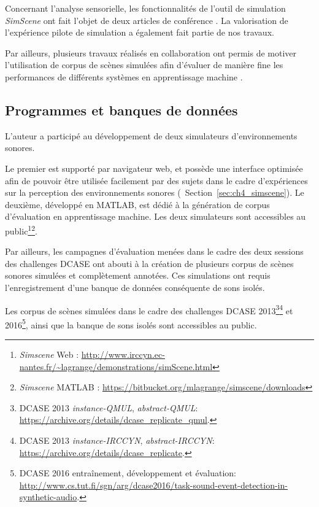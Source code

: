 Concernant l'analyse sensorielle, les fonctionnalités de l'outil de simulation \emph{SimScene} ont fait l'objet de deux articles de conférence  \citep{rossignol2015simscene,lafay2016JAES}. La valorisation de l'expérience pilote de simulation \citep{lafay2014new} a également fait partie de nos travaux.

Par ailleurs, plusieurs travaux réalisés en collaboration ont permis de motiver l'utilisation de corpus de scènes simulées afin d'évaluer de manière fine les performances de différents systèmes en apprentissage machine \citep{benetos2016detectionLDC,rossignol2015alternate,benetos2016detection}.

\subsection{Programmes et banques de données}

L'auteur a participé au développement de deux simulateurs d'environnements sonores.

Le premier est supporté par navigateur web, et possède une interface optimisée afin de pouvoir être utilisée facilement par des sujets dans le cadre d'expériences sur la perception des environnements sonores (\cf~Section~\ref{sec:ch4_simscene}). Le deuxième, développé en MATLAB, est dédié à la génération de corpus d'évaluation en apprentissage machine. Les deux simulateurs sont accessibles au public\footnote{\emph{Simscene} Web :  \url{http://www.irccyn.ec-nantes.fr/~lagrange/demonstrations/simScene.html}}\footnote{\emph{Simscene} MATLAB : \url{https://bitbucket.org/mlagrange/simscene/downloads}}.

Par ailleurs, les campagnes d'évaluation menées dans le cadre des deux sessions des challenges DCASE ont abouti à la création de plusieurs corpus de scènes sonores simulées et complètement annotées. Ces simulations ont requis l'enregistrement d'une banque de données conséquente de sons isolés.

Les corpus de scènes simulées dans le cadre des challenges DCASE 2013\footnote{DCASE 2013 \emph{instance-QMUL}, \emph{abstract-QMUL}: \url{https://archive.org/details/dcase_replicate_qmul}.}\footnote{DCASE 2013 \emph{instance-IRCCYN}, \emph{abstract-IRCCYN}: \url{https://archive.org/details/dcase_replicate}.} et 2016\footnote{DCASE 2016 entraînement, développement et évaluation: \url{http://www.cs.tut.fi/sgn/arg/dcase2016/task-sound-event-detection-in-synthetic-audio}.}, ainsi que la banque de sons isolés sont accessibles au public.








